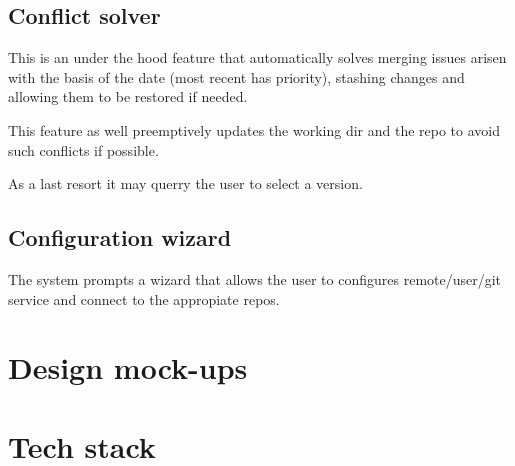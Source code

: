 \documentclass[GitEase.tex]{subfiles}
\begin{document}
\section{Conflict solver}

This is an under the hood feature that automatically solves merging issues arisen with the basis of the date (most recent has priority), stashing changes and allowing them to be restored if needed.

This feature as well preemptively updates the working dir and the repo to avoid such conflicts if possible.

As a last resort it may querry the user to select a version.

\section{Configuration wizard}

The system prompts a wizard that allows the user to configures remote/user/git service and connect to the appropiate repos.

\chapter{Design mock-ups}

\chapter{Tech stack}
\end{document}
